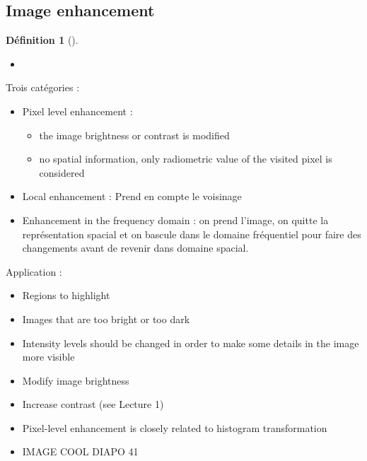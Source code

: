 \documentclass{article}
\theoremstyle{plain}%
\theoremstyle{definition}
\newtheorem{defn}{Définition}[section]
\theoremstyle{remark}
\begin{document}
\subsection{Image enhancement}
\begin{defn}[]
    \begin{itemize}
        \item 
    \end{itemize}
\end{defn}
Trois catégories : \begin{itemize}
    \item Pixel level enhancement : \begin{itemize}
        \item the image brightness or contrast is modified
        \item no spatial information, only radiometric value of the visited pixel is considered
    \end{itemize}
    \item Local enhancement : Prend en compte le voisinage
    \item Enhancement in the frequency domain : on prend l'image, on quitte la représentation spacial et on bascule dans le domaine fréquentiel pour faire des changements avant de revenir dans domaine spacial.
\end{itemize}

Application : \begin{itemize}
    \item Regions to highlight
    \item Images that are too bright or too dark
    \item Intensity levels should be changed in order to make some details in the image more visible
    \item Modify image brightness
    \item Increase contrast (see Lecture 1)
    \item Pixel-level enhancement is closely related to histogram
    transformation
    \item IMAGE COOL DIAPO 41
\end{itemize}
\end{document}
